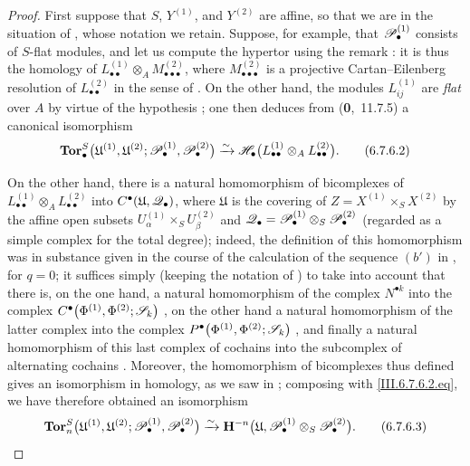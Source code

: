 \begin{proof}
First suppose that $S$, $Y^{(1)}$, and $Y^{(2)}$ are affine, so
that we are in the situation of , whose notation
we retain.  Suppose, for example, that
$\mathscr{P}_\bullet^{(1)}$ consists of $S$-flat modules, and let us compute
the hypertor using the remark : it is thus the homology of $L_{\bullet\bullet}^{(1)}
\otimes_A M_{\bullet\bullet\bullet}^{(2)}$,
where $M_{\bullet\bullet\bullet}^{(2)}$ is a projective
Cartan--Eilenberg resolution of $L_{\bullet\bullet}^{(2)}$ in
the sense of .  On the other hand, the modules
$L_{ij}^{(1)}$ are \emph{flat} over $A$ by virtue of the hypothesis
; one then deduces from
(\textbf{0},~11.7.5) a canonical isomorphism
\[
  \mathbf{Tor}_\bullet^S
  \bigl(
    \mathfrak U^{(1)},\mathfrak U^{(2)};
    \mathscr{P}_\bullet^{(1)},\mathscr{P}_\bullet^{(2)}
  \bigr)
  \xrightarrow{\sim}
  \mathscr{H}_\bullet
  \bigl(
    L_{\bullet\bullet}^{(1)}
    \otimes_A L_{\bullet\bullet}^{(2)}
  \bigr).
  \tag{6.7.6.2}\label{III.6.7.6.2.eq}
\]

On the other hand, there is a natural homomorphism of bicomplexes
of $L_{\bullet\bullet}^{(1)}\otimes_A L_{\bullet\bullet}^{(2)}$ into
$C^\bullet(\mathfrak U,\mathscr{Q}_\bullet)$,
where $\mathfrak U$ is the covering of $Z=X^{(1)}\times_SX^{(2)}$
by the affine open subsets
$U_\alpha^{(1)}\times_SU_\beta^{(2)}$ and $\mathscr{Q}_\bullet
=
\mathscr{P}_\bullet^{(1)}
\otimes_S\mathscr{P}_\bullet^{(2)}$
(regarded as a simple complex for the total degree); indeed, the
definition of this homomorphism was in substance given in the
course of the calculation of the sequence $(b')$ in
, for $q=0$; it suffices simply (keeping the notation of
) to take into account that there is, on the one hand, a natural
homomorphism of the complex $N^{\bullet k}$ into the complex $C^\bullet
\bigl(
\Phi^{(1)},\Phi^{(2)};\mathscr{S}_k
\bigr)$
, on the other hand a natural homomorphism of the
latter complex into the complex $P^\bullet
\bigl(
\Phi^{(1)},\Phi^{(2)};\mathscr{S}_k
\bigr)$
, and finally a natural homomorphism of
this last complex of cochains into the subcomplex of alternating
cochains .  Moreover, the homomorphism of
bicomplexes thus defined gives an isomorphism in homology, as we saw in
; composing with
\eqref{III.6.7.6.2.eq}, we have therefore obtained an isomorphism
\[
  \mathbf{Tor}_n^S
  \bigl(
    \mathfrak U^{(1)},\mathfrak U^{(2)};
    \mathscr{P}_\bullet^{(1)},\mathscr{P}_\bullet^{(2)}
  \bigr)
  \xrightarrow{\sim}
  \mathbf{H}^{-n}
  \bigl(
    \mathfrak U,
    \mathscr{P}_\bullet^{(1)}
    \otimes_S\mathscr{P}_\bullet^{(2)}
  \bigr).
  \tag{6.7.6.3}\label{III.6.7.6.3.eq}
\]


\end{proof}
